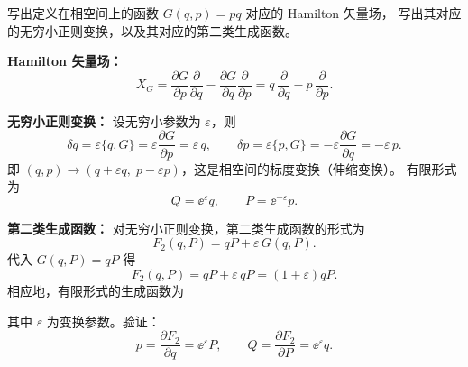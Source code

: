 \begin{question}
写出定义在相空间上的函数 $G(q,p)=pq$ 对应的 Hamilton 矢量场，
写出其对应的无穷小正则变换，以及其对应的第二类生成函数。

\begin{solution}

\textbf{Hamilton 矢量场：}
\[
X_{G}
=\frac{\partial G}{\partial p}\frac{\partial}{\partial q}
-\frac{\partial G}{\partial q}\frac{\partial}{\partial p}
=q\,\frac{\partial}{\partial q}-p\,\frac{\partial}{\partial p}.
\]

\textbf{无穷小正则变换：}
设无穷小参数为 $\varepsilon$，则
\[
\delta q=\varepsilon\{q,G\}=\varepsilon\frac{\partial G}{\partial p}
=\varepsilon\,q,\qquad
\delta p=\varepsilon\{p,G\}=-\varepsilon\frac{\partial G}{\partial q}
=-\varepsilon\,p.
\]
即 $(q,p)\to(q+\varepsilon q,\;p-\varepsilon p)$，这是相空间的标度变换（伸缩变换）。
有限形式为
\[
Q=\ee^{\varepsilon}q,\qquad P=\ee^{-\varepsilon}p.
\]

\textbf{第二类生成函数：}
对无穷小正则变换，第二类生成函数的形式为
\[
F_{2}(q,P)=qP+\varepsilon\,G(q,P).
\]
代入 $G(q,P)=qP$ 得
\[
F_{2}(q,P)=qP+\varepsilon\,qP=(1+\varepsilon)qP.
\]
相应地，有限形式的生成函数为

其中 $\varepsilon$ 为变换参数。验证：
\[
p=\frac{\partial F_{2}}{\partial q}=\ee^{\varepsilon}P,\qquad
Q=\frac{\partial F_{2}}{\partial P}=\ee^{\varepsilon}q.
\]

\end{solution}
\end{question}


